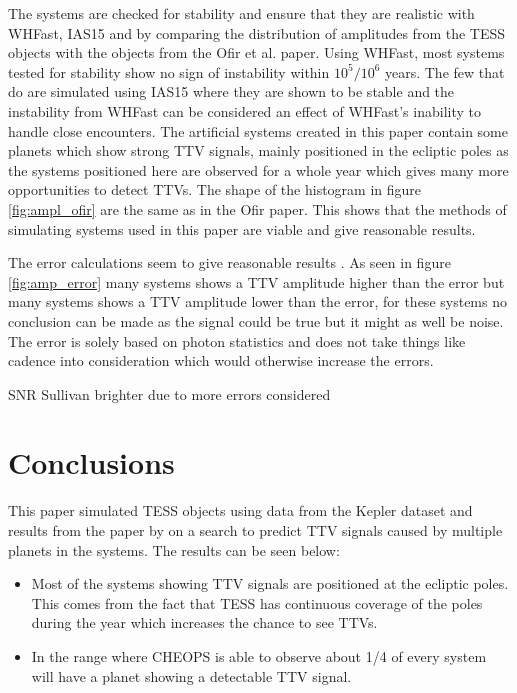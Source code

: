 \documentclass[12pt]{report}
\begin{document}
	The systems are checked for stability and ensure that they are realistic with WHFast, IAS15 and by comparing the distribution of amplitudes from the TESS objects with the objects from the Ofir et al. paper. Using WHFast, most systems tested for stability show no sign of instability within $10^5 / 10^6$ years. The few that do are simulated using IAS15 where they are shown to be stable and the instability from WHFast can be considered an effect of WHFast's inability to handle close encounters. The artificial systems created in this paper contain some planets which show strong TTV signals, mainly positioned in the ecliptic poles as the systems positioned here are observed for a whole year which gives many more opportunities to detect TTVs. The shape of the histogram in figure \ref{fig:ampl_ofir} are the same as in the Ofir paper. This shows that the methods of simulating systems used in this paper are viable and give reasonable results.
	
	The error calculations seem to give reasonable results \citep{2015ApJ...812L..18B}. As seen in figure \ref{fig:amp_error} many systems shows a TTV amplitude higher than the error but many systems shows a TTV amplitude lower than the error, for these systems no conclusion can be made as the signal could be true but it might as well be noise. The error is solely based on photon statistics and does not take things like cadence into consideration which would otherwise increase the errors. 
	
	SNR Sullivan brighter due to more errors considered
	
\chapter{Conclusions}
	This paper simulated TESS objects using data from the Kepler dataset and results from the paper by \cite{2015ApJ...809...77S} on a search to predict TTV signals caused by multiple planets in the systems. The results can be seen below:
	\begin{itemize}
		\item Most of the systems showing TTV signals are positioned at the ecliptic poles. This comes from the fact that TESS has continuous coverage of the poles during the year which increases the chance to see TTVs.
		\item In the range where CHEOPS is able to observe about 1/4 of every system will have a planet showing a detectable TTV signal.
	\end{itemize}
\end{document}
